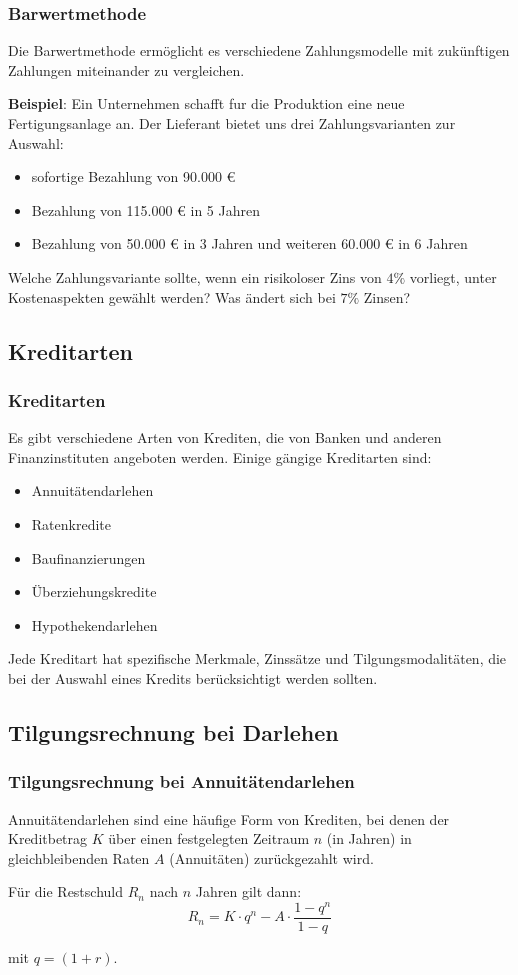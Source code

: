 \documentclass{beamer}
\begin{document}
\begin{frame}
    \frametitle{Barwertmethode}
    Die Barwertmethode ermöglicht es verschiedene Zahlungsmodelle mit zukünftigen Zahlungen miteinander zu vergleichen.

    \textbf{Beispiel}: Ein Unternehmen schafft fur die Produktion eine neue Fertigungsanlage an. Der
    Lieferant bietet uns drei Zahlungsvarianten zur Auswahl:
    \begin{itemize}
        \item sofortige Bezahlung von 90.000 €
        \item Bezahlung von 115.000 € in 5 Jahren
        \item Bezahlung von 50.000 € in 3 Jahren und weiteren 60.000 € in 6 Jahren
    \end{itemize}
    Welche Zahlungsvariante sollte, wenn ein risikoloser Zins von $4\%$ vorliegt, unter Kostenaspekten gewählt werden? Was ändert sich bei $7\%$ Zinsen?
\end{frame}

\subsection{Kreditarten}
\begin{frame}
  \frametitle{Kreditarten}
  
  Es gibt verschiedene Arten von Krediten, die von Banken und anderen Finanzinstituten angeboten werden. Einige gängige Kreditarten sind:
  
  \begin{itemize}
    \item Annuitätendarlehen
    \item Ratenkredite
    \item Baufinanzierungen
    \item Überziehungskredite
    \item Hypothekendarlehen
  \end{itemize}
  
  Jede Kreditart hat spezifische Merkmale, Zinssätze und Tilgungsmodalitäten, die bei der Auswahl eines Kredits berücksichtigt werden sollten.
\end{frame}

\subsection{Tilgungsrechnung bei Darlehen}
\begin{frame}
  \frametitle{Tilgungsrechnung bei Annuitätendarlehen}
  
  Annuitätendarlehen sind eine häufige Form von Krediten, bei denen der Kreditbetrag $K$ über einen festgelegten Zeitraum $n$ (in Jahren) in gleichbleibenden Raten $A$ (Annuitäten) zurückgezahlt wird.

  \vspace{1cm}

  Für die Restschuld $R_n$ nach $n$ Jahren gilt dann: 
  $$R_n = K \cdot q^n - A \cdot \frac{1-q^n}{1-q}$$

  mit $q=(1+r)$.
\end{frame}
\end{document}
